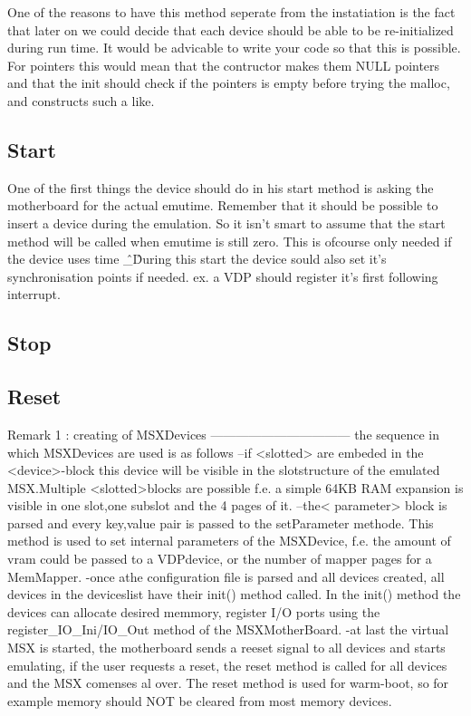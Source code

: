 \documentclass[11pt, a4paper]{report}
\begin{document}
One of the reasons to have this method seperate from the instatiation is the fact that later on we could decide that each device should be able to be re-initialized during run time. It would be advicable to write your code so that this is possible. For pointers this would mean that the contructor makes them NULL pointers and that the init should check if the pointers is empty before trying the malloc, and constructs such a like.

\subsection{Start}
One of the first things the device should do in his start method is asking the motherboard for the actual emutime. Remember that it should be possible to insert a device during the emulation. So it isn't smart to assume that the start method will be called when emutime is still zero. This is ofcourse only needed if the device uses time \^\_\^
During this start the device sould also set it's synchronisation points if needed. ex. a VDP should register it's first following interrupt.

\subsection{Stop}
\subsection{Reset}


Remark 1 : creating of MSXDevices
---------------------------------
the sequence in which MSXDevices are used is as follows
--if <slotted> are embeded in the <device>-block this device will be visible in the slotstructure of the emulated MSX.Multiple <slotted>blocks are possible f.e. a simple 64KB RAM expansion is visible in one slot,one subslot and the 4 pages of it.
--the< parameter> block is parsed and every key,value pair is passed to the setParameter methode. This method is used to set internal parameters of the MSXDevice, f.e. the amount of vram could be passed to a VDPdevice, or the number of mapper pages for a MemMapper.
-once athe configuration file is parsed and all devices created, all devices in the deviceslist have their init() method called. In the init() method the devices can allocate desired memmory, register I/O ports using the register\_IO\_Ini/IO\_Out method of the MSXMotherBoard.
-at last the virtual MSX is started, the motherboard sends a reeset signal to all devices and starts emulating, if the user requests a reset, the reset method is called for all devices and the MSX comenses al over. The reset method is used for warm-boot, so for example memory should NOT be cleared from most memory devices.
\end{document}
